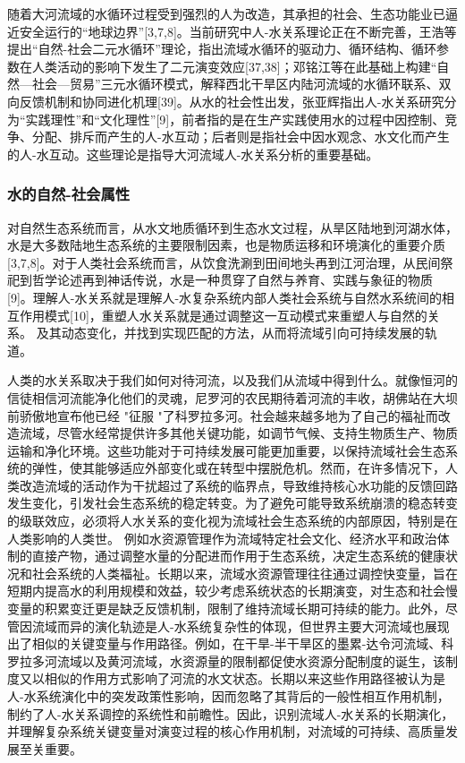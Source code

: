

随着大河流域的水循环过程受到强烈的人为改造，其承担的社会、生态功能业已逼近安全运行的“地球边界”[3,7,8]。当前研究中人-水关系理论正在不断完善，王浩等提出“自然-社会二元水循环”理论，指出流域水循环的驱动力、循环结构、循环参数在人类活动的影响下发生了二元演变效应[37,38]；邓铭江等在此基础上构建“自然—社会—贸易”三元水循环模式，解释西北干旱区内陆河流域的水循环联系、双向反馈机制和协同进化机理[39]。从水的社会性出发，张亚辉指出人-水关系研究分为“实践理性”和“文化理性”[9]，前者指的是在生产实践使用水的过程中因控制、竞争、分配、排斥而产生的人-水互动；后者则是指社会中因水观念、水文化而产生的人-水互动。这些理论是指导大河流域人-水关系分析的重要基础。

\subsubsection*{水的自然-社会属性}

对自然生态系统而言，从水文地质循环到生态水文过程，从旱区陆地到河湖水体，水是大多数陆地生态系统的主要限制因素，也是物质运移和环境演化的重要介质[3,7,8]。对于人类社会系统而言，从饮食洗涮到田间地头再到江河治理，从民间祭祀到哲学论述再到神话传说，水是一种贯穿了自然与养育、实践与象征的物质[9]。理解人-水关系就是理解人-水复杂系统内部人类社会系统与自然水系统间的相互作用模式[10]，重塑人水关系就是通过调整这一互动模式来重塑人与自然的关系。
及其动态变化，并找到实现匹配的方法，从而将流域引向可持续发展的轨道。

人类的水关系取决于我们如何对待河流，以及我们从流域中得到什么。就像恒河的信徒相信河流能净化他们的灵魂，尼罗河的农民期待着河流的丰收，胡佛站在大坝前骄傲地宣布他已经 "征服 "了科罗拉多河。社会越来越多地为了自己的福祉而改造流域，尽管水经常提供许多其他关键功能，如调节气候、支持生物质生产、物质运输和净化环境。这些功能对于可持续发展可能更加重要，以保持流域社会生态系统的弹性，使其能够适应外部变化或在转型中摆脱危机。然而，在许多情况下，人类改造流域的活动作为干扰超过了系统的临界点，导致维持核心水功能的反馈回路发生变化，引发社会生态系统的稳定转变。为了避免可能导致系统崩溃的稳态转变的级联效应，必须将人水关系的变化视为流域社会生态系统的内部原因，特别是在人类影响的人类世。
例如水资源管理作为流域特定社会文化、经济水平和政治体制的直接产物，通过调整水量的分配进而作用于生态系统，决定生态系统的健康状况和社会系统的人类福祉。长期以来，流域水资源管理往往通过调控快变量，旨在短期内提高水的利用规模和效益，较少考虑系统状态的长期演变，对生态和社会慢变量的积累变迁更是缺乏反馈机制，限制了维持流域长期可持续的能力。此外，尽管因流域而异的演化轨迹是人-水系统复杂性的体现，但世界主要大河流域也展现出了相似的关键变量与作用路径。例如，在干旱-半干旱区的墨累-达令河流域、科罗拉多河流域以及黄河流域，水资源量的限制都促使水资源分配制度的诞生，该制度又以相似的作用方式影响了河流的水文状态。长期以来这些作用路径被认为是人-水系统演化中的突发政策性影响，因而忽略了其背后的一般性相互作用机制，制约了人-水关系调控的系统性和前瞻性。因此，识别流域人-水关系的长期演化，并理解复杂系统关键变量对演变过程的核心作用机制，对流域的可持续、高质量发展至关重要。



